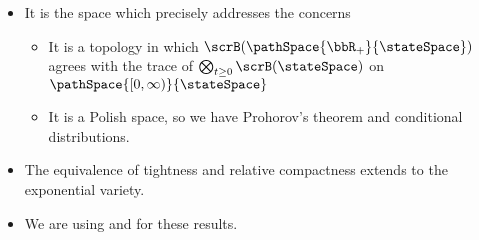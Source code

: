 \begin{itemize}[label=$\circ$]
  \item
    It is the space which precisely addresses the concerns
    \begin{itemize}
      \item
        It is a topology in which $\scrB(\pathSpace{\bbR_+}{\stateSpace})$ agrees with the trace of $\bigotimes_{t\geq0} \scrB(\stateSpace)$ on $\pathSpace{[0,\infty)}{\stateSpace}$
      \item
        It is a Polish space, so we have Prohorov's theorem and conditional distributions.
    \end{itemize}
  \item
    The equivalence of tightness and relative compactness extends to the exponential variety.
  \item
    We are using \cite{jacod2003} and \cite{feng2006} for these results.
\end{itemize}
